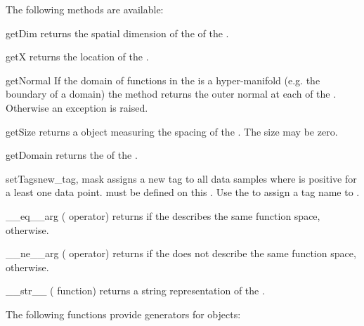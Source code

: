 \vspace{1em}\noindent The following methods are available:
%
\begin{methoddesc}[FunctionSpace]{getDim}{}
    returns the spatial dimension of the \Domain of the \FunctionSpace.
\end{methoddesc}
%
\begin{methoddesc}[FunctionSpace]{getX}{}
    returns the location of the \DataSamplePoints.
\end{methoddesc}
%
\begin{methoddesc}[FunctionSpace]{getNormal}{}
    If the domain of functions in the \FunctionSpace is a hyper-manifold (e.g.
    the boundary of a domain) the method returns the outer normal at each of
    the \DataSamplePoints. Otherwise an exception is raised.
\end{methoddesc}
%
\begin{methoddesc}[FunctionSpace]{getSize}{}
    returns a \Data object measuring the spacing of the \DataSamplePoints.
    The size may be zero.
\end{methoddesc}
%
\begin{methoddesc}[FunctionSpace]{getDomain}{}
    returns the \Domain of the \FunctionSpace.
\end{methoddesc}
%
\begin{methoddesc}[FunctionSpace]{setTags}{new_tag, mask}
    assigns a new tag  to all data samples where  is
    positive for a least one data point.
     must be defined on this \FunctionSpace.
    Use the  to assign a tag name to .
\end{methoddesc}
%
\begin{methoddesc}[FunctionSpace]{__eq__}{arg}
    (\PYTHON \var{==} operator) returns \True if the \FunctionSpace {}
    describes the same function space, \False otherwise.
\end{methoddesc}
%
\begin{methoddesc}[FunctionSpace]{__ne__}{arg}
    (\PYTHON \var{!=} operator) returns \True if the \FunctionSpace {}
    does not describe the same function space, \False otherwise.
\end{methoddesc}

\begin{methoddesc}[Domain]{__str__}{}
    (\PYTHON {} function) returns a string representation of the
    \FunctionSpace.
\end{methoddesc}

\noindent The following functions provide generators for \FunctionSpace objects:

